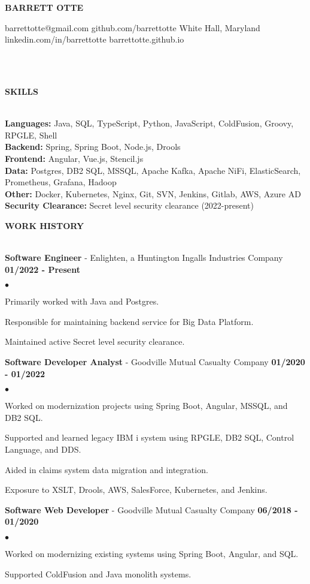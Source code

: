 \documentclass{article}
\newcommand{\lineunder}{
	\vspace*{-4pt}\\ 
	\hspace*{-18pt}\hrulefill \\
}
\newcommand{\header}[1]{
	{\hspace*{-15pt}\vspace*{6pt}\textsc{#1}}\vspace*{-6pt}\lineunder
}
\newcommand{\employer}[3]{
	\textbf{#1} - #2 \vspace*{2pt} \hfill \textbf{#3} \vspace*{2pt}
}
\newcommand{\contact}[6]{
	\begin{center}
		{\Large \textbf \scshape \bfseries{#1}}
	\end{center}
	\small{#2} \hfill \small{#3} \break
	\small{#4} \hfill \small{#5} \break
	\hspace*{20pt} \hfill \small {#6} \break
	\vspace*{-6pt}
	\lineunder
	\vspace*{-6pt}
}
\newenvironment{resumelist}{
	\vspace*{2pt}
	\begin{list}
		{\small$\bullet$}{\topsep 0pt \itemsep -2pt}}{\vspace*{4pt}
	\end{list}
}
\newcommand{\resumeheader}[1]{
	\vspace*{10pt}
	\header{\textbf{#1}}
    \vspace*{3pt}
}
\begin{document}
	\normalsize
	\smallskip
	\vspace*{-44pt}

	\contact
		{BARRETT OTTE}
		{barrettotte@gmail.com}
		{github.com/barrettotte}
		{White Hall, Maryland}
		{linkedin.com/in/barrettotte}
		{barrettotte.github.io}

	\resumeheader{SKILLS}
		\textbf{Languages:}
			Java, SQL, TypeScript, Python, JavaScript, ColdFusion, Groovy, RPGLE, Shell\\
			\vspace*{5pt}
        \textbf{Backend:}
			Spring, Spring Boot, Node.js, Drools\\
			\vspace*{5pt}
		\textbf{Frontend:}
			Angular, Vue.js, Stencil.js\\
			\vspace*{5pt}
        \textbf{Data:}
			Postgres, DB2 SQL, MSSQL, Apache Kafka, Apache NiFi, ElasticSearch, Prometheus, Grafana, Hadoop\\
			\vspace*{5pt}
		\textbf{Other:}
			Docker, Kubernetes, Nginx, Git, SVN, Jenkins, Gitlab, AWS, Azure AD\\
			\vspace*{5pt}
		\textbf{Security Clearance:}
			Secret level security clearance (2022-present)\\
			\vspace*{5pt}

	\resumeheader{WORK HISTORY}
		\employer
			{Software Engineer}{Enlighten, a Huntington Ingalls Industries Company}{01/2022 - Present}
			\begin{resumelist}
				\item Primarily worked with Java and Postgres.
				\item Responsible for maintaining backend service for Big Data Platform.
				\item Maintained active Secret level security clearance.
			\end{resumelist}
			\vspace*{6pt}
        \employer
			{Software Developer Analyst}{Goodville Mutual Casualty Company}{01/2020 - 01/2022}
			\begin{resumelist}
				\item Worked on modernization projects using Spring Boot, Angular, MSSQL, and DB2 SQL.
				\item Supported and learned legacy IBM i system using RPGLE, DB2 SQL, Control Language, and DDS.
				\item Aided in claims system data migration and integration.
				\item Exposure to XSLT, Drools, AWS, SalesForce, Kubernetes, and Jenkins.
			\end{resumelist} 
            \vspace*{6pt}
		\employer
			{Software Web Developer}{Goodville Mutual Casualty Company}{06/2018 - 01/2020}
			\begin{resumelist}
				\item Worked on modernizing existing systems using Spring Boot, Angular, and SQL.
				\item Supported ColdFusion and Java monolith systems.
			\end{resumelist}
\end{document}

